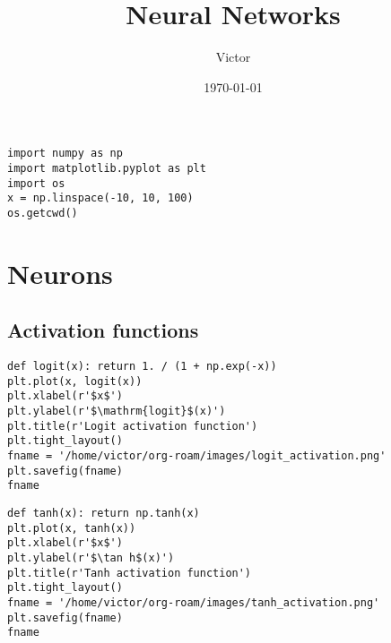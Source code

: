 \documentclass[11pt]{article}
\author{Victor}
\date{\today}
\title{Neural Networks}
\begin{document}
\maketitle
\tableofcontents

\begin{verbatim}
import numpy as np
import matplotlib.pyplot as plt
import os
x = np.linspace(-10, 10, 100)
os.getcwd()
\end{verbatim}

\section{Neurons}
\label{sec:orgea582a2}

\subsection{Activation functions}
\label{sec:orgae47956}


\begin{verbatim}
def logit(x): return 1. / (1 + np.exp(-x))
plt.plot(x, logit(x))
plt.xlabel(r'$x$')
plt.ylabel(r'$\mathrm{logit}$(x)')
plt.title(r'Logit activation function')
plt.tight_layout()
fname = '/home/victor/org-roam/images/logit_activation.png'
plt.savefig(fname)
fname
\end{verbatim}

\begin{verbatim}
def tanh(x): return np.tanh(x)
plt.plot(x, tanh(x))
plt.xlabel(r'$x$')
plt.ylabel(r'$\tan h$(x)')
plt.title(r'Tanh activation function')
plt.tight_layout()
fname = '/home/victor/org-roam/images/tanh_activation.png'
plt.savefig(fname)
fname
\end{verbatim}
\end{document}
